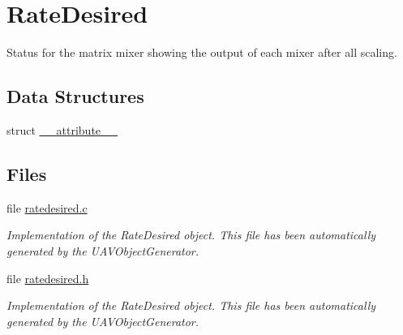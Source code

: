 \hypertarget{group___rate_desired}{\section{\-Rate\-Desired}
\label{group___rate_desired}
}


\-Status for the matrix mixer showing the output of each mixer after all scaling.  


\subsection*{\-Data \-Structures}
\begin{DoxyCompactItemize}
\item 
struct \hyperlink{struct____attribute____}{\-\_\-\-\_\-attribute\-\_\-\-\_\-}
\end{DoxyCompactItemize}
\subsection*{\-Files}
\begin{DoxyCompactItemize}
\item 
file \hyperlink{ratedesired_8c}{ratedesired.\-c}
\begin{DoxyCompactList}\small\item\em \-Implementation of the \-Rate\-Desired object. \-This file has been automatically generated by the \-U\-A\-V\-Object\-Generator. \end{DoxyCompactList}\item 
file \hyperlink{ratedesired_8h}{ratedesired.\-h}
\begin{DoxyCompactList}\small\item\em \-Implementation of the \-Rate\-Desired object. \-This file has been automatically generated by the \-U\-A\-V\-Object\-Generator. \end{DoxyCompactList}\end{DoxyCompactItemize}
